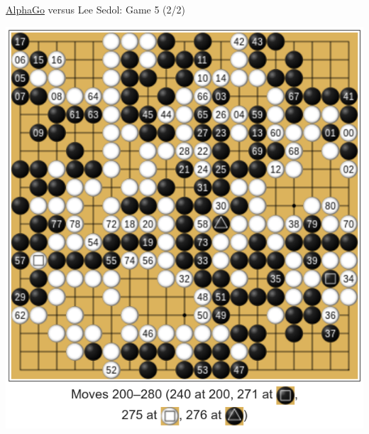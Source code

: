 \documentclass{beamer}
\begin{document}
{    \begin{frame}{{\color{white}\underline{AlphaGo}} versus {\color{black}Lee Sedol}: Game 5 (2/2)}
      \begin{center}
        \includegraphics[height=.85\textheight]{../img/AlphaGo_vs_Lee_Sedol_Game_5b.png}
      \end{center}
    \end{frame}
  }
\end{document}
